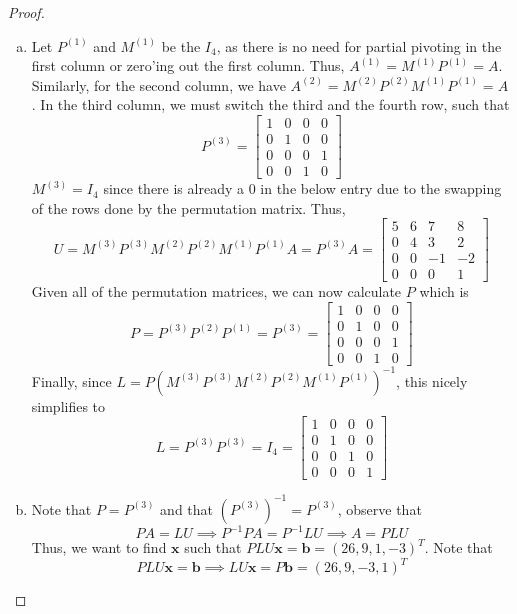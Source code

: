 \documentclass[12pt]{scrartcl}
\begin{document}
\begin{proof}
  \hfill

  \begin{enumerate}[(a)]
  \item Let $P^{(1)}$ and $M^{(1)}$ be the $I_4$, as there is no need for partial pivoting in the first column or zero'ing out the first column.
  Thus, $A^{(1)} = M^{(1)}P^{(1)} = A$. Similarly, for the second column, we have 
  $A^{(2)} = M^{(2)}P^{(2)}M^{(1)}P^{(1)} =A$. In the third column, we must switch the third and the fourth row, such that 
  \[P^{(3)} = \begin{bmatrix}
    1 & 0 & 0 & 0\\
    0 & 1 & 0 & 0\\
    0 & 0 & 0 & 1\\
    0 & 0 & 1 & 0
  \end{bmatrix}\]
  $M^{(3)} = I_4$ since there is already a $0$ in the below entry due to the swapping of the rows done by the permutation matrix. 
  Thus, 
  \[U = M^{(3)}P^{(3)}M^{(2)}P^{(2)}M^{(1)}P^{(1)}A= P^{(3)}A = \begin{bmatrix}
    5 & 6 & 7 & 8\\
    0 & 4 & 3 & 2\\
    0 & 0 & -1 & -2\\
    0 & 0 & 0 & 1
  \end{bmatrix}\]
  Given all of the permutation matrices, we can now calculate $P$ which is 
  \[P = P^{(3)}P^{(2)}P^{(1)} = P^{(3)} = \begin{bmatrix}
    1 & 0 & 0 & 0\\
    0 & 1 & 0 & 0\\
    0 & 0 & 0 & 1\\
    0 & 0 & 1 & 0
  \end{bmatrix}\]
  Finally, since $L = P(M^{(3)}P^{(3)}M^{(2)}P^{(2)}M^{(1)}P^{(1)})^{-1}$, this 
  nicely simplifies to 
  \[L = P^{(3)}P^{(3)} = I_4 = \begin{bmatrix}
    1 & 0 & 0 & 0\\
    0 & 1 & 0 & 0\\
    0 & 0 & 1 & 0\\
    0 & 0 & 0 & 1
  \end{bmatrix}\]
  \item Note that $P = P^{(3)}$ and that $(P^{(3)})^{-1} = P^{(3)}$, observe that 
  \[PA = LU \implies P^{-1}PA = P^{-1}LU \implies A = PLU\]
  Thus, we want to find $\textbf{x}$ such that $PLU\textbf{x} = \textbf{b} = (26, 9, 1, -3)^T$. Note that 
  \[PLU\textbf{x} = \textbf{b} \implies LU\textbf{x} = P\textbf{b} = (26, 9, -3, 1)^T\]

\end{enumerate}
\end{proof}
\end{document}
